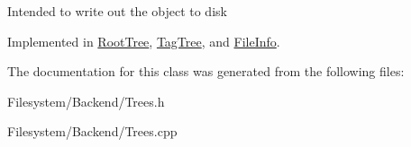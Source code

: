 Intended to write out the object to disk 

Implemented in \mbox{\hyperlink{classRootTree_ad6eefe5d46ee37b3725799897a78c2dd}{Root\+Tree}}, \mbox{\hyperlink{classTagTree_adf13e01b25991ecfef1ad958e02c07fe}{Tag\+Tree}}, and \mbox{\hyperlink{classFileInfo_a8e835f000ddfd0f1097ccfa7e7801a09}{File\+Info}}.



The documentation for this class was generated from the following files\+:\begin{DoxyCompactItemize}
\item 
Filesystem/\+Backend/Trees.\+h\item 
Filesystem/\+Backend/Trees.\+cpp\end{DoxyCompactItemize}

